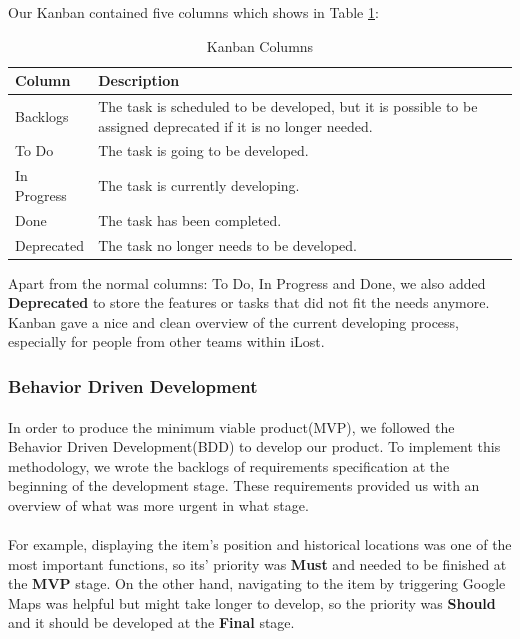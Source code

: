 \documentclass[12pt,a4paper]{article}
\begin{document}
          Our Kanban contained five columns which shows in Table \ref{table:Kanban Columns}:
          
          \begin{table}[H]
            \centering
              \begin{tabularx}{\textwidth}{l X}
                \hline
                Column & Description  \\ \hline
                Backlogs & The task is scheduled to be developed, but it is possible to be assigned deprecated if it is no longer needed. \\ 
                To Do & The task is going to be developed.  \\ 
                In Progress & The task is currently developing.  \\ 
                Done & The task has been completed.   \\ 
                Deprecated & The task no longer needs to be developed.\\                  
                \hline
              \end{tabularx}
              \caption[Table caption text]{Kanban Columns}
              \label{table:Kanban Columns}
          \end{table}
          
          Apart from the normal columns: To Do, In Progress and Done, we also added {\bf Deprecated} to store the features or tasks that did not fit the needs anymore. Kanban gave a nice and clean overview of the current developing process, especially for people from other teams within iLost.
        
        \subsubsection{Behavior Driven Development}
          \paragraph{}In order to produce the minimum viable product(MVP), we followed the Behavior Driven Development(BDD) to develop our product. To implement this methodology, we wrote the backlogs of requirements specification at the beginning of the development stage. These requirements provided us with an overview of what was more urgent in what stage. 

          \paragraph{}For example, displaying the item's position and historical locations was one of the most important functions, so its' priority was {\bf Must} and needed to be finished at the {\bf MVP} stage. On the other hand, navigating to the item by triggering Google Maps was helpful but might take longer to develop, so the priority was {\bf Should} and it should be developed at the {\bf Final} stage. 
          
\end{document}
